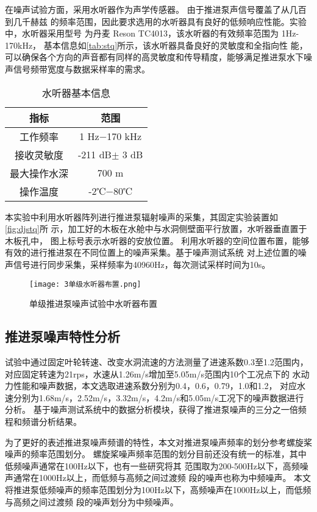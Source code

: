 在噪声试验方面，采用水听器作为声学传感器。
由于推进泵声信号覆盖了从几百到几千赫兹
的频率范围，因此要求选用的水听器具有良好的低频响应性能。实验中，水听器采用型号
为丹麦 Reson TC4013，该水听器的有效频率范围为 1Hz-170kHz，
基本信息如\autoref{tab:stq}所示，该水听器具备良好的灵敏度和全指向性
能，可以确保各个方向的声音都有同样的高灵敏度和传导精度，能够满足推进泵水下噪声信号频带宽度与数据采样率的需求。
\begin{table}[htbp]
    \centering
    \caption{\label{tab:stq}水听器基本信息}
    \begin{tabular}{cc}
     \toprule
     指标&范围\\
     \midrule
     工作频率&1 Hz$- $170 kHz\\
     接收灵敏度&-211 dB$\pm$ 3 dB\\
     最大操作水深&700 m\\
     操作温度&-2℃$- $80℃\\
     \bottomrule
    \end{tabular}
\end{table}

本实验中利用水听器阵列进行推进泵辐射噪声的采集，其固定实验装置如\autoref{fig:djstq}所
示，加工好的木板在水舱中与水洞侧壁面平行放置，水听器垂直置于木板孔中，
图上标号表示水听器的安放位置。
利用水听器的空间位置布置，能够有效的进行推进泵在不同位置上的噪声采集。基于噪声测试系统
对上述位置的噪声信号进行同步采集，采样频率为40960Hz，每次测试采样时间为10s。
\begin{figure}[htbp]
    \centering
    \texttt{[image: 3单级水听器布置.png]}
    \caption{\label{fig:djstq}单级推进泵噪声试验中水听器布置}
\end{figure}
\subsection{推进泵噪声特性分析}
试验中通过固定叶轮转速、改变水洞流速的方法测量了进速系数0.3至1.2范围内，
对应固定转速为21rps，水速从1.26m/s增加至5.05m/s范围内10个工况点下的
水动力性能和噪声数据，本文选取进速系数分别为0.4，0.6，0.79，1.0和1.2，
对应水速分别为1.68m/s，2.52m/s，3.32m/s，4.2m/s和5.05m/s工况下的噪声数据进行分析。
基于噪声测试系统中的数据分析模块，获得了推进泵噪声的三分之一倍频程和频谱分析结果。

为了更好的表述推进泵噪声频谱的特性，本文对推进泵噪声频率的划分参考螺旋桨噪声的频率范围划分。
螺旋桨噪声频率范围的划分目前还没有统一的标准，其中
低频噪声通常在100Hz以下，也有一些研究将其
范围取为200-500Hz以下，高频噪声通常在1000Hz以上，而低频与高频之间过渡频
段的噪声也称为中频噪声。
本文将推进泵低频噪声的频率范围划分为100Hz以下，高频噪声在1000Hz以上，而低频与高频之间过渡频
段的噪声划分为中频噪声。

